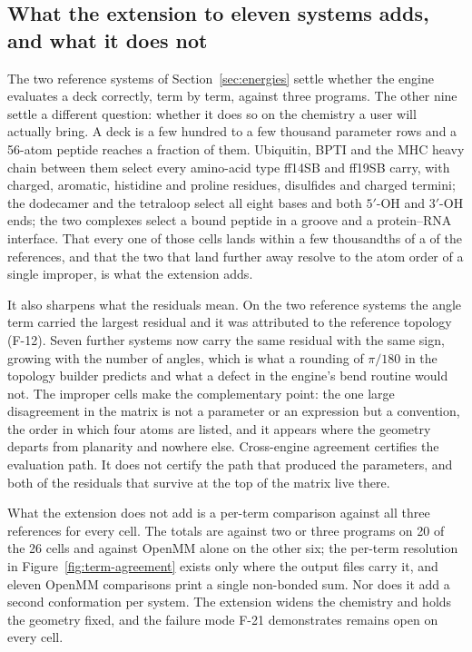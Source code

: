\subsection{What the extension to eleven systems adds, and what it does not}
\label{sec:elevenadds}

The two reference systems of Section~\ref{sec:energies} settle whether the
engine evaluates a deck correctly, term by term, against three programs. The
other nine settle a different question: whether it does so on the chemistry a
user will actually bring. A deck is a few hundred to a few thousand parameter
rows and a 56-atom peptide reaches a fraction of them. Ubiquitin, BPTI and the
MHC heavy chain between them select every amino-acid type ff14SB and ff19SB
carry, with charged, aromatic, histidine and proline residues, disulfides and
charged termini; the dodecamer and the tetraloop select all eight bases and both
$5'$-OH and $3'$-OH ends; the two complexes select a bound peptide in a groove
and a protein--RNA interface. That every one of those cells lands within a few
thousandths of a \kcal{} of the references, and that the two that land further
away resolve to the atom order of a single improper, is what the extension
adds.

It also sharpens what the residuals mean. On the two reference systems the
angle term carried the largest residual and it was attributed to the reference
topology (F-12). Seven further systems now carry the same residual with the
same sign, growing with the number of angles, which is what a rounding of
$\pi/180$ in the topology builder predicts and what a defect in the engine's
bend routine would not. The improper cells make the complementary point: the
one large disagreement in the matrix is not a parameter or an expression but a
convention, the order in which four atoms are listed, and it appears where the
geometry departs from planarity and nowhere else. Cross-engine agreement
certifies the evaluation path. It does not certify the path that produced the
parameters, and both of the residuals that survive at the top of the matrix
live there.

What the extension does not add is a per-term comparison against all three
references for every cell. The totals are against two or three programs on 20
of the 26 cells and against OpenMM alone on the other six; the per-term
resolution in Figure~\ref{fig:term-agreement} exists only where the output
files carry it, and eleven OpenMM comparisons print a single non-bonded sum.
Nor does it add a second conformation per system. The extension widens the
chemistry and holds the geometry fixed, and the failure mode F-21 demonstrates
remains open on every cell.

